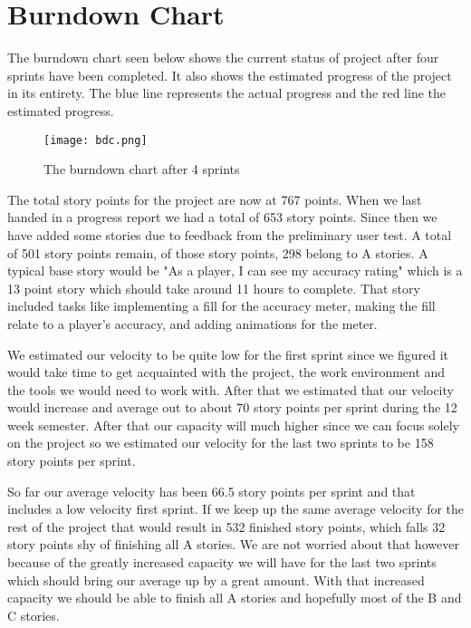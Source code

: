 \section{Burndown Chart}\label{sec:burndown}
The burndown chart seen below shows the current status of project after four sprints have been completed. It also shows the estimated progress of the project in its entirety. The blue line represents the actual progress and the red line the estimated progress.

\begin{figure}[H]
	\centering
	\graphicspath{ {./graphics/} }
    \centerline{\texttt{[image: bdc.png]}}
    \caption{\label{fig:bdchart}The burndown chart after 4 sprints}
\end{figure}

The total story points for the project are now at 767 points. When we last handed in a progress report we had a total of 653 story points. Since then we have added some stories due to feedback from the preliminary user test. A total of 501 story points remain, of those story points, 298 belong to A stories. A typical base story would be "As a player, I can see my accuracy rating" which is a 13 point story which should take around 11 hours to complete. That story included tasks like implementing a fill for the accuracy meter, making the fill relate to a player's accuracy, and adding animations for the meter.

We estimated our velocity to be quite low for the first sprint since we figured it would take time to get acquainted with the project, the work environment and the tools we would need to work with. After that we estimated that our velocity would increase and average out to about 70 story points per sprint during the 12 week semester. After that our capacity will much higher since we can focus solely on the project so we estimated our velocity for the last two sprints to be 158 story points per sprint. 

So far our average velocity has been 66.5 story points per sprint and that includes a low velocity first sprint. If we keep up the same average velocity for the rest of the project that would result in 532 finished story points, which falls 32 story points shy of finishing all A stories. We are not worried about that however because of the greatly increased capacity we will have for the last two sprints which should bring our average up by a great amount. With that increased capacity we should be able to finish all A stories and hopefully most of the B and C stories.

